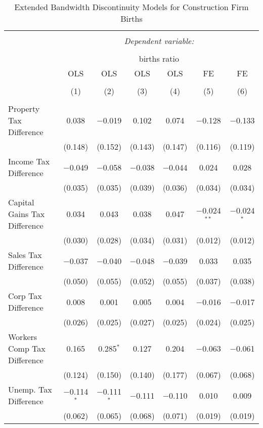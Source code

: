 
\begin{table}[!htbp] \centering 
  \caption{Extended Bandwidth Discontinuity Models for  Construction Firm Births} 
  \label{23eb} 
\begin{tabular}{@{\extracolsep{5pt}}lcccccc} 
\\[-1.8ex]\hline 
\hline \\[-1.8ex] 
 & \multicolumn{6}{c}{\textit{Dependent variable:}} \\ 
\cline{2-7} 
\\[-1.8ex] & \multicolumn{6}{c}{births ratio} \\ 
 & OLS & OLS & OLS & OLS & FE & FE \\ 
\\[-1.8ex] & (1) & (2) & (3) & (4) & (5) & (6)\\ 
\hline \\[-1.8ex] 
 Property Tax Difference & 0.038 & $-$0.019 & 0.102 & 0.074 & $-$0.128 & $-$0.133 \\ 
  & (0.148) & (0.152) & (0.143) & (0.147) & (0.116) & (0.119) \\ 
  Income Tax Difference & $-$0.049 & $-$0.058 & $-$0.038 & $-$0.044 & 0.024 & 0.028 \\ 
  & (0.035) & (0.035) & (0.039) & (0.036) & (0.034) & (0.034) \\ 
  Capital Gains Tax Difference & 0.034 & 0.043 & 0.038 & 0.047 & $-$0.024$^{**}$ & $-$0.024$^{*}$ \\ 
  & (0.030) & (0.028) & (0.034) & (0.031) & (0.012) & (0.012) \\ 
  Sales Tax Difference & $-$0.037 & $-$0.040 & $-$0.048 & $-$0.039 & 0.033 & 0.035 \\ 
  & (0.050) & (0.055) & (0.052) & (0.055) & (0.037) & (0.038) \\ 
  Corp Tax Difference & 0.008 & 0.001 & 0.005 & 0.004 & $-$0.016 & $-$0.017 \\ 
  & (0.026) & (0.025) & (0.027) & (0.025) & (0.024) & (0.025) \\ 
  Workers Comp Tax Difference & 0.165 & 0.285$^{*}$ & 0.127 & 0.204 & $-$0.063 & $-$0.061 \\ 
  & (0.124) & (0.150) & (0.140) & (0.177) & (0.067) & (0.068) \\ 
  Unemp. Tax Difference & $-$0.114$^{*}$ & $-$0.111$^{*}$ & $-$0.111 & $-$0.110 & 0.010 & 0.009 \\ 
  & (0.062) & (0.065) & (0.068) & (0.071) & (0.019) & (0.019) \\ 

\end{tabular}
\end{table}
